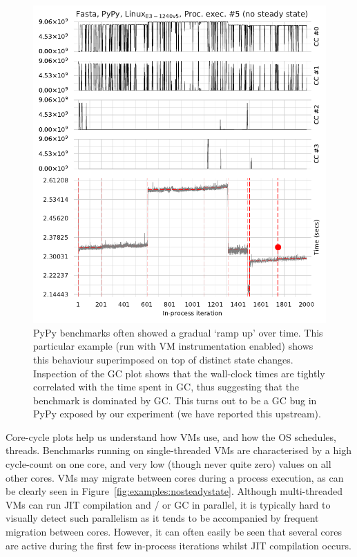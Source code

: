 \documentclass[acmlarge]{acmart}\settopmatter{printfolios=true}
\begin{document}
\begin{figure}[!tbp]
\begin{minipage}[t]{0.485\textwidth}
\includegraphics[width=\textwidth]{examples/new_good_comp.pdf}
\caption{ PyPy benchmarks often showed a gradual `ramp up' over time. This
particular example (run with VM instrumentation enabled) shows this behaviour
superimposed on top of distinct state changes. Inspection of the GC plot shows
that the wall-clock times are tightly correlated with the time spent in GC, thus
suggesting that the benchmark is dominated by GC. This turns out to be a GC bug
in PyPy exposed by our experiment (we have reported this upstream).}
\label{fig:goodcomp}
\end{minipage}
\end{figure}

Core-cycle plots help us understand how VMs use, and how the OS schedules,
threads. Benchmarks running on single-threaded VMs are characterised by a high
cycle-count on one core, and very low (though never quite zero) values on all
other cores. VMs may migrate between cores during a process
execution, as can be clearly seen in Figure~\ref{fig:examples:nosteadystate}.
Although multi-threaded VMs can run JIT compilation and / or GC in parallel,
it is typically hard to visually detect such parallelism as it tends to be
accompanied by frequent migration between cores.
However, it can often easily be seen that several cores are active during the first few
in-process iterations whilst JIT compilation occurs.
\end{document}
